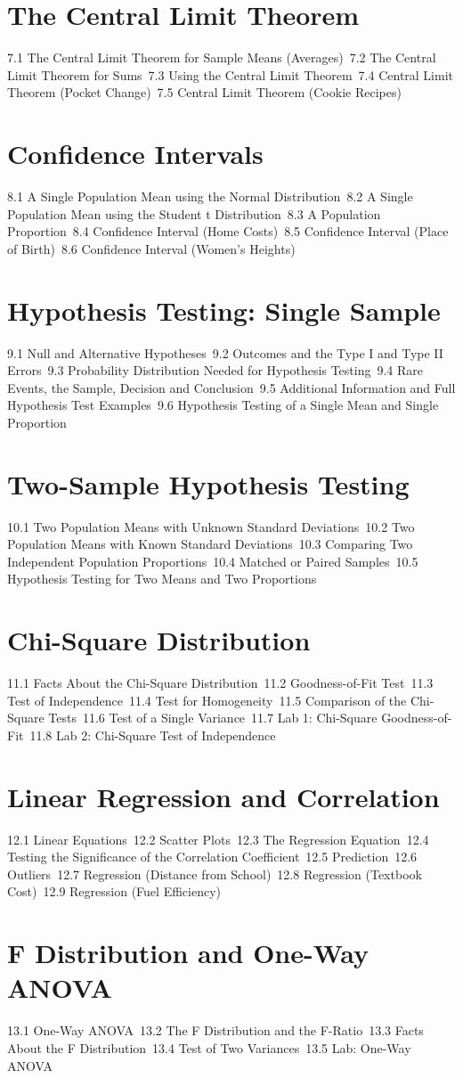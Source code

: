 \section{The Central Limit Theorem}
7.1 The Central Limit Theorem for Sample Means (Averages)\
7.2 The Central Limit Theorem for Sums\
7.3 Using the Central Limit Theorem\
7.4 Central Limit Theorem (Pocket Change)\
7.5 Central Limit Theorem (Cookie Recipes)\
\section{Confidence Intervals}
8.1 A Single Population Mean using the Normal Distribution\
8.2 A Single Population Mean using the Student t Distribution\
8.3 A Population Proportion\
8.4 Confidence Interval (Home Costs)\
8.5 Confidence Interval (Place of Birth)\
8.6 Confidence Interval (Women's Heights)\
\section{Hypothesis Testing: Single Sample}
9.1 Null and Alternative Hypotheses\
9.2 Outcomes and the Type I and Type II Errors\
9.3 Probability Distribution Needed for Hypothesis Testing\
9.4 Rare Events, the Sample, Decision and Conclusion\
9.5 Additional Information and Full Hypothesis Test Examples\
9.6 Hypothesis Testing of a Single Mean and Single Proportion\
\section{Two-Sample Hypothesis Testing}
10.1 Two Population Means with Unknown Standard Deviations\
10.2 Two Population Means with Known Standard Deviations\
10.3 Comparing Two Independent Population Proportions\
10.4 Matched or Paired Samples\
10.5 Hypothesis Testing for Two Means and Two Proportions\
\section{Chi-Square Distribution}
11.1 Facts About the Chi-Square Distribution\
11.2 Goodness-of-Fit Test\
11.3 Test of Independence\
11.4 Test for Homogeneity\
11.5 Comparison of the Chi-Square Tests\
11.6 Test of a Single Variance\
11.7 Lab 1: Chi-Square Goodness-of-Fit\
11.8 Lab 2: Chi-Square Test of Independence\
\section{Linear Regression and Correlation}
12.1 Linear Equations\
12.2 Scatter Plots\
12.3 The Regression Equation\
12.4 Testing the Significance of the Correlation Coefficient\
12.5 Prediction\
12.6 Outliers\
12.7 Regression (Distance from School)\
12.8 Regression (Textbook Cost)\
12.9 Regression (Fuel Efficiency)\
\section{F Distribution and One-Way ANOVA}
13.1 One-Way ANOVA\
13.2 The F Distribution and the F-Ratio\
13.3 Facts About the F Distribution\
13.4 Test of Two Variances\
13.5 Lab: One-Way ANOVA\
